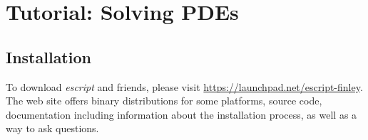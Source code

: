 
%
%
%

\chapter{Tutorial: Solving PDEs}
\label{CHAP: Tutorial}

\section{Installation}
\label{INSTALL}
To download {\it escript} and friends, please visit \url{https://launchpad.net/escript-finley}.
The web site offers binary distributions for some platforms, source code,
documentation including information about the installation process, as well as
a way to ask questions.








% 
